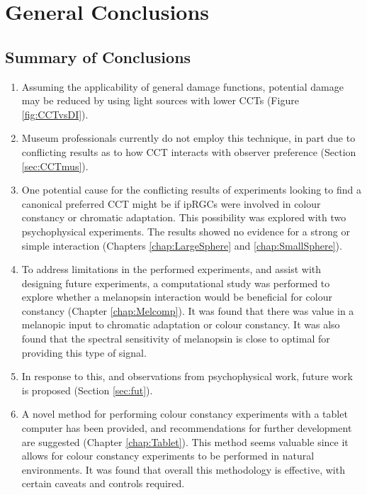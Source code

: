 \chapter{General Conclusions}
\label{chap:Conclusions}

\section{Summary of Conclusions}

\begin{enumerate}
\item Assuming the applicability of general damage functions, potential damage may be reduced by using light sources with lower \glspl{CCT} (Figure \ref{fig:CCTvsDI}).
\item Museum professionals currently do not employ this technique, in part due to conflicting results as to how \gls{CCT} interacts with observer preference (Section \ref{sec:CCTmus}).
\item One potential cause for the conflicting results of experiments looking to find a canonical preferred \gls{CCT} might be if \glspl{ipRGC} were involved in colour constancy or chromatic adaptation. This possibility was explored with two psychophysical experiments. The results showed no evidence for a strong or simple interaction (Chapters \ref{chap:LargeSphere} and \ref{chap:SmallSphere}).
\item To address limitations in the performed experiments, and assist with designing future experiments, a computational study was performed to explore whether a melanopsin interaction would be beneficial for colour constancy (Chapter \ref{chap:Melcomp}). It was found that there was value in a melanopic input to chromatic adaptation or colour constancy. It was also found that the spectral sensitivity of melanopsin is close to optimal for providing this type of signal.
\item In response to this, and observations from psychophysical work, future work is proposed (Section \ref{sec:fut}).
\item A novel method for performing colour constancy experiments with a tablet computer has been provided, and recommendations for further development are suggested (Chapter \ref{chap:Tablet}). This method seems valuable since it allows for colour constancy experiments to be performed in natural environments. It was found that overall this methodology is effective, with certain caveats and controls required.
\end{enumerate}

